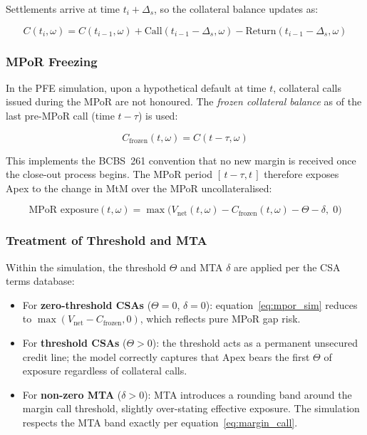 \documentclass[11pt,a4paper]{article}
\begin{document}
Settlements arrive at time $t_i + \Delta_s$, so the collateral balance updates
as:

\begin{equation}
  C(t_i, \omega) = C(t_{i-1}, \omega) + \text{Call}(t_{i-1} - \Delta_s, \omega)
  - \text{Return}(t_{i-1} - \Delta_s, \omega)
  \label{eq:col_balance}
\end{equation}

\subsubsection{MPoR Freezing}

In the PFE simulation, upon a hypothetical default at time $t$, collateral
calls issued during the MPoR are not honoured. The \emph{frozen collateral
balance} as of the last pre-MPoR call (time $t - \tau$) is used:

\begin{equation}
  C_{\text{frozen}}(t, \omega) = C(t - \tau, \omega)
  \label{eq:col_frozen}
\end{equation}

This implements the BCBS~261 convention that no new margin is received once
the close-out process begins. The MPoR period $[\,t-\tau, t\,]$ therefore
exposes Apex to the change in MtM over the MPoR uncollateralised:

\begin{equation}
  \text{MPoR exposure}(t, \omega)
    = \max\!\bigl(V_{\text{net}}(t,\omega) - C_{\text{frozen}}(t,\omega)
      - \Theta - \delta,\; 0\bigr)
  \label{eq:mpor_sim}
\end{equation}

\subsubsection{Treatment of Threshold and MTA}

Within the simulation, the threshold $\Theta$ and MTA $\delta$ are applied
per the CSA terms database:

\begin{itemize}[noitemsep]
  \item For \textbf{zero-threshold CSAs} ($\Theta = 0$, $\delta = 0$):
        equation~\eqref{eq:mpor_sim} reduces to
        $\max(V_{\text{net}} - C_{\text{frozen}}, 0)$, which reflects pure
        MPoR gap risk.
  \item For \textbf{threshold CSAs} ($\Theta > 0$): the threshold acts as
        a permanent unsecured credit line; the model correctly captures that
        Apex bears the first $\Theta$ of exposure regardless of
        collateral calls.
  \item For \textbf{non-zero MTA} ($\delta > 0$): MTA introduces a rounding
        band around the margin call threshold, slightly over-stating effective
        exposure. The simulation respects the MTA band exactly per
        equation~\eqref{eq:margin_call}.
\end{itemize}
\end{document}
